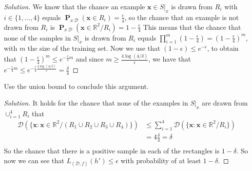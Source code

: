 \documentclass[10pt, a4paper, twoside]{amsart}
\newcommand{\R}{\ensuremath{\mathbb{R}}}
\renewcommand{\P}{\operatorname*{\ensuremath{\mathbf{P}}}}
\newenvironment{solution}
               {\let\oldqedsymbol=\qedsymbol
                \renewcommand{\qedsymbol}{$\blacktriangleleft$}
                \begin{proof}[Solution]}
               {\end{proof}
                \renewcommand{\qedsymbol}{\oldqedsymbol}}
\begin{document}
\begin{solution}
  We know that the chance an example $\mathbf{x} \in S|_x$ is drawn from $R_i$ with $i \in \{1,\ldots, 4\}$ equals $\P_{x~\mathcal{D}}(\mathbf{x}\in R_i) = \frac{\epsilon}{4}$, so the chance that an example is not drawn from $R_i$ is $\P_{x~\mathcal{D}}(\mathbf{x}\in \R^2/R_i) = 1-\frac{\epsilon}{4}$ This means that the chance that none of the samples in $S|_x$ is drawn from $R_i$ equals $\prod_{i = 1}^m(1-\frac{\epsilon}{4}) = (1-\frac{\epsilon}{4})^m$, with $m$ the size of the training set. Now we use that $(1-\epsilon)\leq e^{-\epsilon}$, to obtain that $(1-\frac{\epsilon}{4})^m \leq e^{- \frac{\epsilon}{4}m}$ and since $m \geq \frac{4\log (4/\delta)}{\epsilon}$, we have that $e^{- \frac{\epsilon}{4}m} \leq e^{-\frac{\epsilon}{4}\frac{4\log (4/\delta)}{\epsilon}}= \frac{\delta}{4}$
\end{solution}
Use the union bound to conclude this argument. \\
\begin{solution}
  It holds for the chance that none of the examples in $S|_x$ are drawn from $\cup_{i=1}^4 R_i$  that
\begin{align*}
  \mathcal{D}(\{\mathbf{x}:\mathbf{x}\in \R^2/(R_1 \cup R_2 \cup R_3 \cup R_4)\}) & \leq \sum_{i=1}^4 \mathcal{D}(\{\mathbf{x}:\mathbf{x}\in \R^2/R_i\}) \\
                                                                                 & = 4\frac{\delta}{4} = \delta \\
\end{align*}
So the chance that there is a positive sample in each of the rectangles is $1-\delta$. So now we can see that $L_{(\mathcal{D},f)}(h')\leq \epsilon$ with probability of at least $1 - \delta$.
\end{solution}
\end{document}
